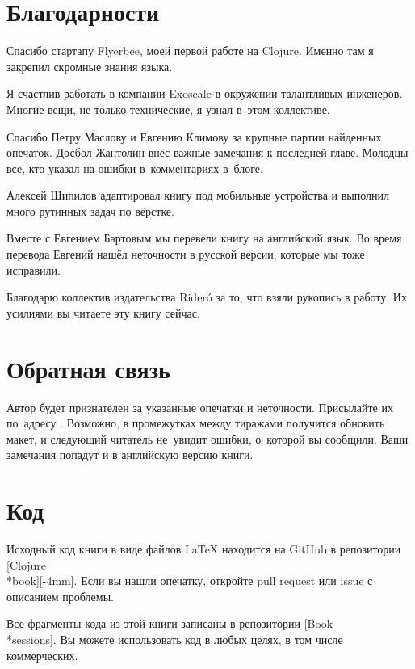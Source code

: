\section*{Благодарности}

Спасибо стартапу Flyerbee, моей первой работе на Clojure. Именно там я закрепил
скромные знания языка.

Я счастлив работать в компании Exoscale в окружении талантливых
инженеров. Многие вещи, не только технические, я узнал в~этом коллективе.

Спасибо Петру Маслову и Евгению Климову за крупные партии найденных
опечаток. Досбол Жантолин внёс важные замечания к последней главе. Молодцы все,
кто указал на ошибки в~комментариях в~блоге.

Алексей Шипилов адаптировал книгу под мобильные устройства и выполнил много
рутинных задач по вёрстке.

Вместе с Евгением Бартовым мы перевели книгу на английский язык. Во время
перевода Евгений нашёл неточности в русской версии, которые мы тоже исправили.

\ifridero
Благодарю коллектив издательства Rider\'{o} за то, что взяли рукопись в
работу. Их усилиями вы читаете эту книгу сейчас.
\fi

\section*{Обратная связь}

Автор будет признателен за указанные опечатки и неточности. Присылайте их
по~адресу \EMAILLINK. Возможно, в промежутках между тиражами получится обновить
макет, и следующий читатель не~увидит ошибки, о~которой вы сообщили. Ваши
замечания попадут и в английскую версию книги.

\section*{Код}

Исходный код книги в виде файлов \LaTeX{} находится на GitHub в репозитории
[Clojure\\*book][-4mm]. Если
вы нашли опечатку, откройте pull request или issue с описанием проблемы.

Все фрагменты кода из этой книги записаны в репозитории
[Book\\*sessions]. Вы
можете использовать код в любых целях, в том числе коммерческих.

